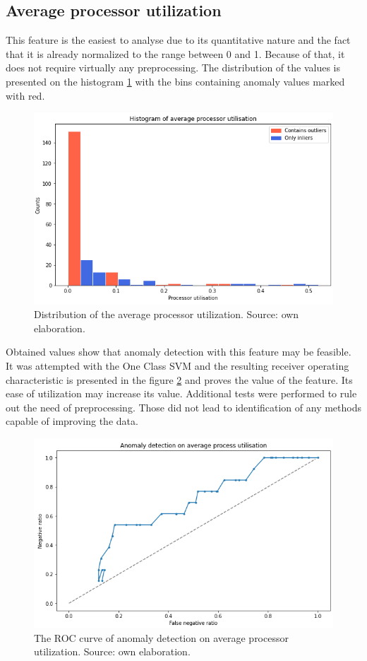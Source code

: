 \documentclass[a4paper,twoside,12pt]{book}
\begin{document}
\subsection{Average processor utilization}

This feature is the easiest to analyse due to its quantitative nature and the fact that it is
already normalized to the range between 0 and 1. Because of that, it does not require virtually 
any preprocessing. The distribution of the values is presented on the 
histogram \ref{fig:histavgproc} with the bins containing anomaly values marked with red. 

\begin{figure}
	\centering
	\includegraphics[scale=0.9]{images/HistAvgProcs}
	\caption{Distribution of the average processor utilization. Source: own elaboration.}
	\label{fig:histavgproc}
 \end{figure}

Obtained values show that anomaly detection with this feature may be feasible. It was attempted with 
the One Class SVM and the resulting receiver operating characteristic is presented in the figure
\ref{fig:procroc} and proves the value of the feature. Its ease of utilization may increase its value.
Additional tests were performed to rule out the need of preprocessing. Those did not lead to identification
of any methods capable of improving the data.

\begin{figure}
	\centering
	\includegraphics[scale=0.9]{images/ProcROCKF}
	\caption{The ROC curve of anomaly detection on average processor utilization. Source: own elaboration.}
	\label{fig:procroc}
 \end{figure}
\end{document}

